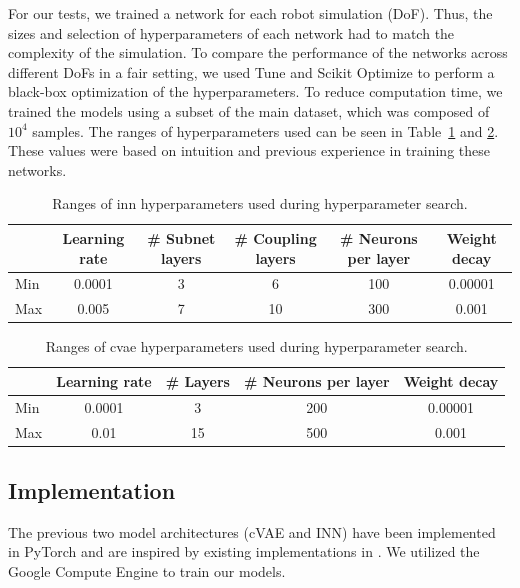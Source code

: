 \documentclass[conference]{IEEEtran}
\begin{document}
For our tests, we trained a network for each robot simulation (DoF). Thus, the sizes and selection of hyperparameters of each network had to match the complexity of the simulation. To compare the performance of the networks across different DoFs in a fair setting, we used Tune \cite{liaw2018tune} and Scikit Optimize \cite{scikit-optimize} to perform a black-box optimization of the hyperparameters. To reduce computation time, we trained the models using a subset of the main dataset, which was composed of \( 10^4 \) samples. The ranges of hyperparameters used can be seen in Table~\ref{tab:hyperparameter-ranges-inn} and \ref{tab:hyperparameter-ranges-cvae}. These values were based on intuition and previous experience in training these networks.

\begin{table}[h]
    \caption{Ranges of inn hyperparameters used during hyperparameter search.}
    \label{tab:hyperparameter-ranges-inn}
    \centering
    \begin{tabular}{|l|c|c|c|c|c|}
    \hline
      & Learning rate & \# Subnet layers & \# Coupling layers & \# Neurons per layer & Weight decay \\
     \hline
     Min  & 0.0001 & 3 & 6 & 100 & 0.00001 \\
     Max  & 0.005 & 7 & 10 & 300 & 0.001 \\
     \hline
    \end{tabular}
\end{table}

\begin{table}[h]
    \caption{Ranges of cvae hyperparameters used during hyperparameter search.}
    \label{tab:hyperparameter-ranges-cvae}
    \centering
    \begin{tabular}{|l|c|c|c|c|}
    \hline
      & Learning rate & \# Layers & \# Neurons per layer & Weight decay \\
     \hline
     Min  & 0.0001 & 3 & 200 & 0.00001 \\
     Max  & 0.01 & 15 & 500 & 0.001 \\
     \hline
    \end{tabular}
\end{table}

\subsection*{Implementation}

The previous two model architectures (cVAE and INN) have been implemented in PyTorch and are inspired by existing implementations in  \cite{graviraja2019, freia2020}. We utilized the Google Compute Engine to train our models.
\end{document}
